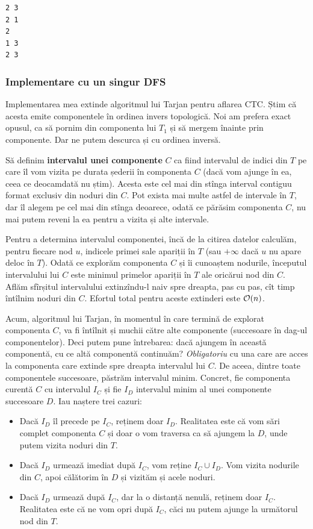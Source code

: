 \documentclass[../main.tex]{subfiles}
\begin{document}
\begin{verbatim}
2 3
2 1
2
1 3
2 3
\end{verbatim}

\subsubsection*{Implementare cu un singur DFS}

Implementarea mea extinde algoritmul lui Tarjan pentru aflarea CTC. Știm că acesta emite componentele în ordinea invers topologică. Noi am prefera exact opusul, ca să pornim din componenta lui $T_1$ și să mergem înainte prin componente. Dar ne putem descurca și cu ordinea inversă.

Să definim \textbf{intervalul unei componente} $C$ ca fiind intervalul de indici din $T$ pe care îl vom vizita pe durata șederii în componenta $C$ (dacă vom ajunge în ea, ceea ce deocamdată nu știm). Acesta este cel mai din stînga interval contiguu format exclusiv din noduri din $C$. Pot exista mai multe astfel de intervale în $T$, dar îl alegem pe cel mai din stînga deoarece, odată ce părăsim componenta $C$, nu mai putem reveni la ea pentru a vizita și alte intervale.

Pentru a determina intervalul componentei, încă de la citirea datelor calculăm, pentru fiecare nod $u$, indicele primei sale apariții în $T$ (sau $+\infty$ dacă $u$ nu apare deloc în $T$). Odată ce explorăm componenta $C$ și îi cunoaștem nodurile, începutul intervalului lui $C$ este minimul primelor apariții în $T$ ale oricărui nod din $C$. Aflăm sfîrșitul intervalului extinzîndu-l naiv spre dreapta, pas cu pas, cît timp întîlnim noduri din $C$. Efortul total pentru aceste extinderi este $\mathcal{O}(n)$.

Acum, algoritmul lui Tarjan, în momentul în care termină de explorat componenta $C$, va fi întîlnit și muchii către alte componente (succesoare în dag-ul componentelor). Deci putem pune întrebarea: dacă ajungem în această componentă, cu ce altă componentă continuăm? \textit{Obligatoriu} cu una care are acces la componenta care extinde spre dreapta intervalul lui $C$. De aceea, dintre toate componentele succesoare, păstrăm intervalul minim. Concret, fie componenta curentă $C$ cu intervalul $I_C$ și fie $I_D$ intervalul minim al unei componente succesoare $D$. Iau naștere trei cazuri:

\begin{itemize}
  \item Dacă $I_D$ îl precede pe $I_C$, reținem doar $I_D$. Realitatea este că vom sări complet componenta $C$ și doar o vom traversa ca să ajungem la $D$, unde putem vizita noduri din $T$.

  \item Dacă $I_D$ urmează imediat după $I_C$, vom reține $I_C \cup I_D$. Vom vizita nodurile din $C$, apoi călătorim în $D$ și vizităm și acele noduri.

  \item Dacă $I_D$ urmează după $I_C$, dar la o distanță nenulă, reținem doar $I_C$. Realitatea este că ne vom opri după $I_C$, căci nu putem ajunge la următorul nod din $T$.
\end{itemize}
\end{document}
